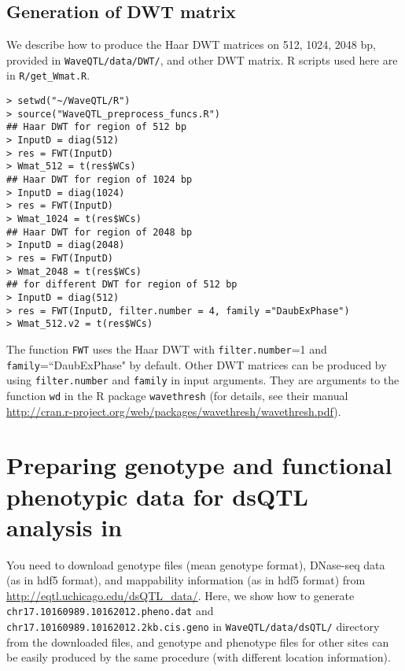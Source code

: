 \documentclass[11pt]{article}
\begin{document}
\subsection{Generation of DWT matrix}\label{DWT}
We describe how to produce the Haar DWT matrices on 512, 1024, 2048 bp, provided in {\tt WaveQTL/data/DWT/}, and other DWT matrix. 
R scripts used here are in {\tt R/get\_Wmat.R}.
\begin{verbatim}
> setwd("~/WaveQTL/R")
> source("WaveQTL_preprocess_funcs.R")
## Haar DWT for region of 512 bp
> InputD = diag(512)
> res = FWT(InputD)
> Wmat_512 = t(res$WCs)
## Haar DWT for region of 1024 bp
> InputD = diag(1024)
> res = FWT(InputD)
> Wmat_1024 = t(res$WCs)
## Haar DWT for region of 2048 bp
> InputD = diag(2048)
> res = FWT(InputD)
> Wmat_2048 = t(res$WCs)
## for different DWT for region of 512 bp
> InputD = diag(512)
> res = FWT(InputD, filter.number = 4, family ="DaubExPhase")
> Wmat_512.v2 = t(res$WCs)
\end{verbatim}
The function {\tt FWT} uses the Haar DWT with {\tt filter.number}=1 and {\tt family}=``DaubExPhase" by default. Other DWT matrices can be produced by using {\tt filter.number} and {\tt family} in input arguments. They are arguments to the function {\tt wd} in the R package {\tt wavethresh} (for details, see their manual \url{http://cran.r-project.org/web/packages/wavethresh/wavethresh.pdf}). 




\section{Preparing genotype and functional phenotypic data for dsQTL analysis in  \cite{Shim2014}}\label{Replicate.preprocss}
You need to download genotype files (mean genotype format), DNase-seq data (as in hdf5 format), and mappability information (as in hdf5 format) from \url{http://eqtl.uchicago.edu/dsQTL_data/}. Here, we show how to generate {\tt chr17.10160989.10162012.pheno.dat} and {\tt chr17.10160989.10162012.2kb.cis.geno} in {\tt WaveQTL/data/dsQTL/} directory from the downloaded files, and genotype and phenotype files for other sites can be easily produced by the same procedure (with different location information).
\end{document}
